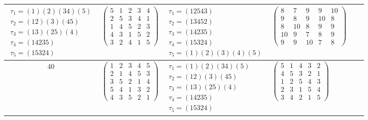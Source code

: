 \begin{longtable}{|c|p{2.7cm}|p{2.7cm}|p{2.7cm}|p{2.7cm}|p{3.3cm}|}
    $\begin{array}{l}\tau_{1}=(1)(2)(34)(5)\\ \tau_{2}=(12)(3)(45)\\ \tau_{3}=(13)(25)(4)\\ \tau_{4}=(14235)\\ \tau_{5}=(15324)\end{array}$     &
    $\begin{pmatrix}5&1&2&3&4\\2&5&3&4&1\\1&4&5&2&3\\4&3&1&5&2\\3&2&4&1&5\end{pmatrix}$                                                         &
    $\begin{array}{l}\tau_{1}=(12543)\\ \tau_{2}=(13452)\\ \tau_{3}=(14235)\\ \tau_{4}=(15324)\\ \tau_{5}=(1)(2)(3)(4)(5)\end{array}$           &
    $\begin{pmatrix}8&7&9&9&10\\9&8&9&10&8\\8&10&8&9&9\\10&9&7&8&9\\9&9&10&7&8\end{pmatrix}$                                                                                                                                \\
    \hline
    40                                                                                                                                          &
    $\begin{pmatrix}1&2&3&4&5\\2&1&4&5&3\\3&5&2&1&4\\5&4&1&3&2\\4&3&5&2&1\end{pmatrix}$                                                         &
    $\begin{array}{l}\tau_{1}=(1)(2)(34)(5)\\ \tau_{2}=(12)(3)(45)\\ \tau_{3}=(13)(25)(4)\\ \tau_{4}=(14235)\\ \tau_{5}=(15324)\end{array}$     &
    $\begin{pmatrix}5&1&4&3&2\\4&5&3&2&1\\1&2&5&4&3\\2&3&1&5&4\\3&4&2&1&5\end{pmatrix}$                                                         &

\end{longtable}
